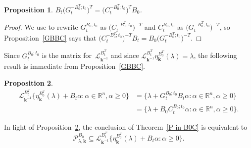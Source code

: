 \documentclass{amsart}
\newtheorem{proposition}{Proposition}[section]
\theoremstyle{definition}
\theoremstyle{remark}
\numberwithin{equation}{section}
\newcommand{\reals}{\mathbb R}
\newcommand{\sett}[1]{{\bigl\lbrace #1 \bigr\rbrace}}
\newcommand{\0}{{\mathbf{0}}}
\newcommand{\kk}{{\boldsymbol{k}}}
\renewcommand{\L}{\mathcal{L}}
\renewcommand{\P}{\mathcal{P}}
\begin{document}
\begin{proposition}\label{BGCB}
$B_t\bigl(G_t^{-B_0^T;t_0}\bigr)^T=\bigl(C_t^{-B_0^T;t_0}\bigr)^TB_0$.
\end{proposition}
\begin{proof}
We use \cite[Theorem~1.2]{NZ} to rewrite $G_t^{B_0;t_0}$ as $\bigl(C_t^{-B_0^T;t_0}\bigr)^{-T}$ and $C_t^{B_0;t_0}$ as $\bigl(G_t^{-B_0^T;t_0}\bigr)^{-T}$, so Proposition~\ref{GBBC} says that $\bigl(C_t^{-B_0^T;t_0}\bigr)^{-T}B_t=B_0\bigl(G_t^{-B_0^T;t_0}\bigr)^{-T}$.
\end{proof}

Since $G_t^{B_0;t_0}$ is the matrix for~$\L_{\kk^{-1}}^{B_t^T}$ and since $\L_{\kk^{-1}}^{B_t^T}\eta_\kk^{B_0^T}(\lambda)=\lambda$, the following result is immediate from Proposition~\ref{GBBC}.

\begin{proposition}\label{B0C}
\begin{align*}
\L_{\kk^{-1}}^{B_t^T}\sett{\eta_\kk^{B_0^T}(\lambda)+B_t\alpha:\alpha\in\reals^n,\alpha\ge0}
&=\sett{\lambda+G_t^{B_0;t_0}B_t\alpha:\alpha\in\reals^n,\alpha\ge0}\\
&=\sett{\lambda+B_0C_t^{B_0;t_0}\alpha:\alpha\in\reals^n,\alpha\ge0}.
\end{align*}
\end{proposition}

In light of Proposition~\ref{B0C}, the conclusion of Theorem~\ref{P in B0C} is equivalent to
\[\P^{B_0}_{\lambda,\kk}\subseteq\L_{\kk^{-1}}^{B_t^T}\sett{\eta_\kk^{B_0^T}(\lambda)+B_t\alpha:\alpha\ge0}.\]
\end{document}
